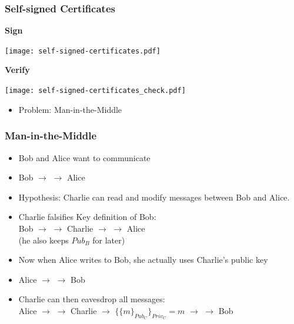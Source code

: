 \documentclass[
hyperref={pdfpagelabels=false}
,xcolor=table
]
{beamer}
\begin{document}
\begin{frame}
  \frametitle{Self-signed Certificates}

  \begin{minipage}[t]{.45\linewidth}
    \textbf{Sign}
    
    \texttt{[image: self-signed-certificates.pdf]}        
  \end{minipage}
  \hfill
  \begin{minipage}[t]{.45\linewidth}
    \textbf{Verify}
    
    \texttt{[image: self-signed-certificates\_check.pdf]}    
  \end{minipage}

  \begin{itemize}
  \item Problem: Man-in-the-Middle
  \end{itemize}
  
\end{frame}

\begin{frame}
  \frametitle{Man-in-the-Middle}

  \begin{itemize}
  \item Bob and Alice want to communicate
  \item Bob $\longrightarrow$  $\longrightarrow$ Alice
  \item Hypothesis: Charlie can read and modify messages between Bob and Alice. 
  \item Charlie falsifies Key definition of Bob: \\
    Bob $\longrightarrow$  $\longrightarrow$ Charlie $\longrightarrow$  $\longrightarrow$ Alice\\
    (he also keeps $Pub_B$ for later)
  \item Now when Alice writes to Bob, she actually uses Charlie's public key
  \item Alice $\longrightarrow$  $\longrightarrow$ Bob
  \item Charlie can then eavesdrop all messages:\\
    Alice $\longrightarrow$  $\longrightarrow$ Charlie $\rightarrow$ $\{\{m\}_{Pub_C}\}_{Priv_C} = m$ $\longrightarrow$  $\longrightarrow$ Bob
  \end{itemize}
  
\end{frame}
\end{document}
